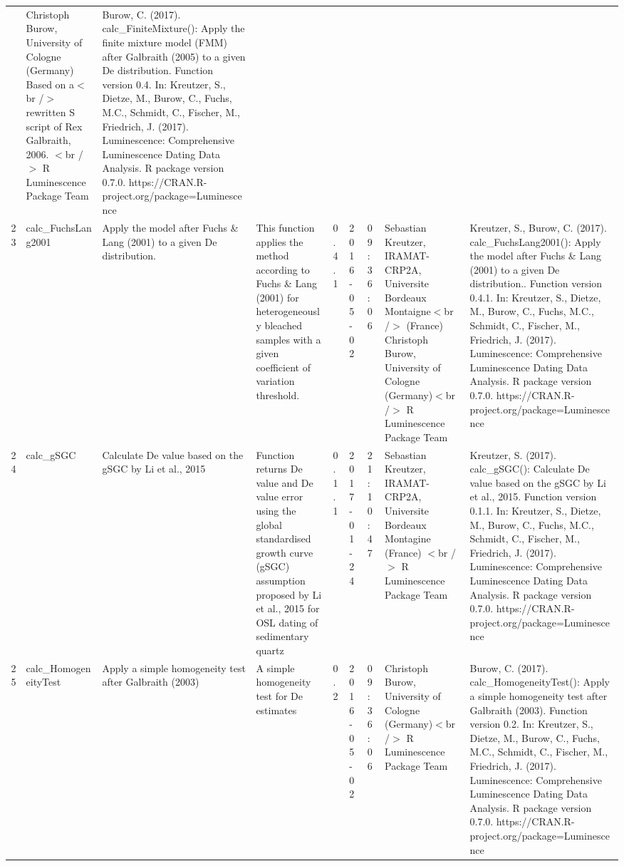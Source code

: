 \begin{table}[ht]
\begin{tabular}{rllllllll}
 & Christoph Burow, University of Cologne (Germany)   Based on a$<$br /$>$ rewritten S script of Rex Galbraith, 2006.  $<$br /$>$  R Luminescence Package Team & Burow, C. (2017). calc\_FiniteMixture(): Apply the finite mixture model (FMM) after Galbraith (2005) to a given De distribution. Function version 0.4. In: Kreutzer, S., Dietze, M., Burow, C., Fuchs, M.C., Schmidt, C., Fischer, M., Friedrich, J. (2017). Luminescence: Comprehensive Luminescence Dating Data Analysis. R package version 0.7.0. https://CRAN.R-project.org/package=Luminescence
 \\ 
  23 & calc\_FuchsLang2001 & Apply the model after Fuchs \& Lang (2001) to a given De distribution. & This function applies the method according to Fuchs \& Lang (2001) for heterogeneously bleached samples with a given coefficient of variation threshold. & 0.4.1 & 2016-05-02 & 09:36:06
 & Sebastian Kreutzer, IRAMAT-CRP2A, Universite Bordeaux Montaigne$<$br /$>$ (France) Christoph Burow, University of Cologne (Germany)$<$br /$>$  R Luminescence Package Team & Kreutzer, S., Burow, C. (2017). calc\_FuchsLang2001(): Apply the model after Fuchs \& Lang (2001) to a given De distribution.. Function version 0.4.1. In: Kreutzer, S., Dietze, M., Burow, C., Fuchs, M.C., Schmidt, C., Fischer, M., Friedrich, J. (2017). Luminescence: Comprehensive Luminescence Dating Data Analysis. R package version 0.7.0. https://CRAN.R-project.org/package=Luminescence
 \\ 
  24 & calc\_gSGC & Calculate De value based on the gSGC by Li et al., 2015 & Function returns De value and De value error using the global standardised growth curve (gSGC) assumption proposed by Li et al., 2015 for OSL dating of sedimentary quartz & 0.1.1 & 2017-01-24 & 21:10:47
 & Sebastian Kreutzer, IRAMAT-CRP2A, Universite Bordeaux Montagine (France) $<$br /$>$  R Luminescence Package Team & Kreutzer, S. (2017). calc\_gSGC(): Calculate De value based on the gSGC by Li et al., 2015. Function version 0.1.1. In: Kreutzer, S., Dietze, M., Burow, C., Fuchs, M.C., Schmidt, C., Fischer, M., Friedrich, J. (2017). Luminescence: Comprehensive Luminescence Dating Data Analysis. R package version 0.7.0. https://CRAN.R-project.org/package=Luminescence
 \\ 
  25 & calc\_HomogeneityTest & Apply a simple homogeneity test after Galbraith (2003) & A simple homogeneity test for De estimates & 0.2 & 2016-05-02 & 09:36:06
 & Christoph Burow, University of Cologne (Germany)$<$br /$>$  R Luminescence Package Team & Burow, C. (2017). calc\_HomogeneityTest(): Apply a simple homogeneity test after Galbraith (2003). Function version 0.2. In: Kreutzer, S., Dietze, M., Burow, C., Fuchs, M.C., Schmidt, C., Fischer, M., Friedrich, J. (2017). Luminescence: Comprehensive Luminescence Dating Data Analysis. R package version 0.7.0. https://CRAN.R-project.org/package=Luminescence

\end{tabular}
\end{table}
